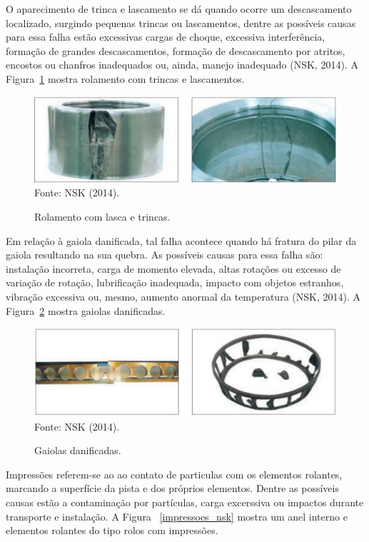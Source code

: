 \documentclass[
	12pt,				
	oneside,			
	a4paper,			
	english,			
	brazil,			
	]{abntex2ppgsi}
\begin{document}
O aparecimento de trinca e lascamento se dá quando ocorre um descascamento localizado, surgindo pequenas trincas ou lascamentos, dentre as possíveis causas para essa falha estão excessivas cargas de choque, excessiva interferência, formação de grandes descascamentos, formação de descascamento por atritos, encostos ou chanfros inadequados ou, ainda, manejo inadequado (NSK, 2014). A Figura~\ref{trinca_nsk} mostra rolamento com trincas e lascamentos. 

\begin{figure}[H]
\centering
\caption {Rolamento com lasca e trincas.}
\includegraphics[width=\textwidth,height=\textheight,keepaspectratio]{trinca_nsk} \\
Fonte: NSK (2014).
\label{trinca_nsk}
\end{figure}

Em relação à gaiola danificada, tal falha acontece quando há fratura do pilar da gaiola resultando na sua quebra. As possíveis causas para essa falha são: instalação incorreta, carga de momento elevada, altas rotações ou excesso de variação de rotação, lubrificação inadequada, impacto com objetos estranhos, vibração excessiva ou, mesmo, aumento anormal da temperatura (NSK, 2014). A Figura~\ref{gaiola_nsk} mostra gaiolas danificadas. 

\begin{figure}[H]
\centering
\caption {Gaiolas danificadas.}
\includegraphics[width=\textwidth,height=\textheight,keepaspectratio]{gaiola_nsk} \\
Fonte: NSK (2014).
\label{gaiola_nsk}
\end{figure}

Impressões referem-se ao ao contato de particulas com os elementos rolantes, marcando a superfície da pista e dos próprios elementos. Dentre as possíveis causas estão a contaminação por partículas, carga excerssiva ou impactos durante transporte e instalação. A Figura ~\ref{impressoes_nsk} mostra um anel interno e elementos rolantes do tipo rolos com impressões. 
\end{document}

